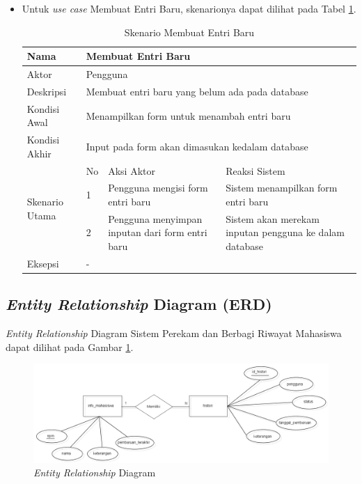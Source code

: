 \begin{itemize}
\item Untuk {\it use case} Membuat Entri Baru, skenarionya dapat dilihat pada Tabel
\ref{tab:skenarioentribaru}.

\begin{table}[ht]
\centering
\caption[Tabel Skenario Membuat Entri Baru]{Skenario Membuat Entri Baru}
\label{tab:skenarioentribaru}
\begin{tabular}{|p{1.4cm}|p{0.4cm}|p{2cm}|p{2cm}|p{2cm}|p{2cm}|}
\hline
Nama & \multicolumn{5}{p{8cm}|}{Membuat Entri Baru} \\ \hline
Aktor & \multicolumn{5}{p{8cm}|}{Pengguna} \\ \hline
Deskripsi & \multicolumn{5}{p{8cm}|}{Membuat entri baru yang belum ada pada
database} \\ \hline
Kondisi Awal & \multicolumn{5}{p{8cm}|}{Menampilkan form untuk menambah entri
baru} \\ \hline
Kondisi Akhir & \multicolumn{5}{p{8cm}|}{Input pada form akan dimasukan kedalam
database} \\ \hline
\multirow{3}{*}{\parbox{1.4cm}{Skenario Utama}} & No &
\multicolumn{2}{p{4cm}|}{Aksi Aktor} & \multicolumn{2}{p{4cm}|}{Reaksi Sistem}
\\ \cline{2-6}
& 1 & \multicolumn{2}{p{4cm}|}{Pengguna mengisi form entri baru} &
\multicolumn{2}{p{4cm}|}{Sistem menampilkan form entri baru} \\ \cline{2-6}
& 2 & \multicolumn{2}{p{4cm}|}{Pengguna menyimpan inputan dari form entri baru}
& \multicolumn{2}{p{4cm}|}{Sistem akan merekam inputan pengguna ke dalam
database} \\ \hline
Eksepsi & \multicolumn{5}{p{8cm}|}{-} \\ \hline
\end{tabular}
\end{table}
\end{itemize}

\subsection{{\it Entity Relationship} Diagram (ERD)}
{\it Entity Relationship} Diagram Sistem Perekam dan Berbagi Riwayat Mahasiswa dapat
dilihat pada Gambar \ref{fig:erd}.

\begin{figure}[ht]
\centering
\includegraphics[scale=0.4]{Gambar/ERD.png}
\caption[{\it Entity Relationship} Diagram]{{\it Entity Relationship} Diagram} 
\label{fig:erd}
\end{figure}

